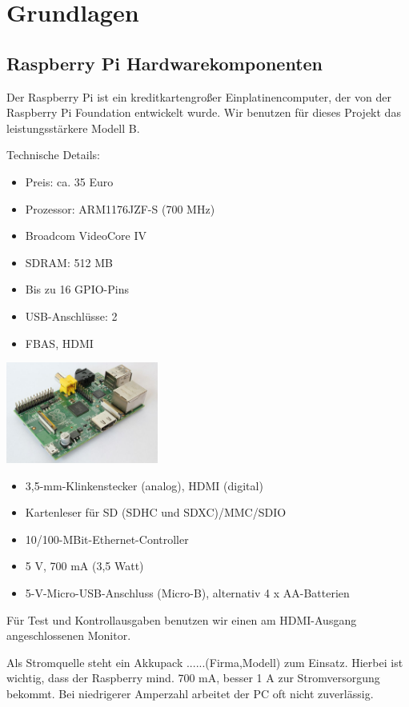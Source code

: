 \documentclass[12pt]{article}
\begin{document}
\section{Grundlagen}

\subsection{Raspberry Pi Hardwarekomponenten}
Der Raspberry Pi ist ein kreditkartengroßer Einplatinencomputer, der von der Raspberry Pi Foundation entwickelt wurde.
Wir benutzen für dieses Projekt das leistungsstärkere Modell B.
\parbox{8cm}{
Technische Details:
\begin{itemize}
\item Preis: ca. 35 Euro
\item Prozessor: ARM1176JZF-S (700 MHz)
\item Broadcom VideoCore IV
\item SDRAM: 512 MB
\item Bis zu 16 GPIO-Pins
\item USB-Anschlüsse: 2
\item FBAS, HDMI
\end{itemize}
}
\hfill
\parbox{5cm}{
\includegraphics[width=5cm]{Raspi.jpg}
}
\begin{itemize}
\item 3,5-mm-Klinkenstecker (analog), HDMI (digital)
\item Kartenleser für SD (SDHC und SDXC)/MMC/SDIO
\item 10/100-MBit-Ethernet-Controller 
\item 5 V, 700 mA (3,5 Watt)
\item 5-V-Micro-USB-Anschluss (Micro-B), alternativ 4 x AA-Batterien
\end{itemize}

Für Test und Kontrollausgaben benutzen wir einen am HDMI-Ausgang angeschlossenen Monitor.

Als Stromquelle steht ein Akkupack ......(Firma,Modell) zum Einsatz. 
Hierbei ist wichtig, dass der Raspberry mind. 700 mA, besser 1 A zur Stromversorgung bekommt. 
Bei niedrigerer Amperzahl arbeitet der PC oft nicht zuverlässig.
\end{document}
